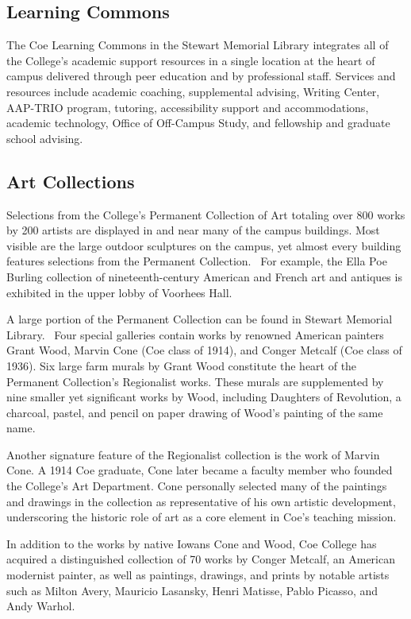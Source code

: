 \documentclass[
  letterpaper,
]{scrbook}
\begin{document}
\hypertarget{learning-commons}{%
\subsection{Learning Commons}\label{learning-commons}}

The Coe Learning Commons in the Stewart Memorial Library integrates all
of the College's academic support resources in a single location at the
heart of campus delivered through peer education and by professional
staff. Services and resources include academic coaching, supplemental
advising, Writing Center, AAP-TRIO program, tutoring, accessibility
support and accommodations, academic technology, Office of Off-Campus
Study, and fellowship and graduate school advising.

\hypertarget{art-collections}{%
\subsection{Art Collections}\label{art-collections}}

Selections from the College's Permanent Collection of Art totaling over
800 works by 200 artists are displayed in and near many of the campus
buildings. Most visible are the large outdoor sculptures on the campus,
yet almost every building features selections from the Permanent
Collection.~ For example, the Ella Poe Burling collection of
nineteenth-century American and French art and antiques is exhibited in
the upper lobby of Voorhees Hall.

A large portion of the Permanent Collection can be found in Stewart
Memorial Library.~ Four special galleries contain works by renowned
American painters Grant Wood, Marvin Cone (Coe class of 1914), and
Conger Metcalf (Coe class of 1936). Six large farm murals by Grant Wood
constitute the heart of the Permanent Collection's Regionalist works.
These murals are supplemented by nine smaller yet significant works by
Wood, including Daughters of Revolution, a charcoal, pastel, and pencil
on paper drawing of Wood's painting of the same name.

Another signature feature of the Regionalist collection is the work of
Marvin Cone. A 1914 Coe graduate, Cone later became a faculty member who
founded the College's Art Department. Cone personally selected many of
the paintings and drawings in the collection as representative of his
own artistic development, underscoring the historic role of art as a
core element in Coe's teaching mission.

In addition to the works by native Iowans Cone and Wood, Coe College has
acquired a distinguished collection of 70 works by Conger Metcalf, an
American modernist painter, as well as paintings, drawings, and prints
by notable artists such as Milton Avery, Mauricio Lasansky, Henri
Matisse, Pablo Picasso, and Andy Warhol.
\end{document}

